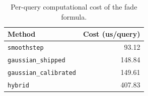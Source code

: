 \begin{table}[htb]
\centering
\caption{Per-query computational cost of the fade formula.}
\label{tab:fadecost}
\footnotesize
\setlength{\tabcolsep}{4pt}
\begin{tabular}{@{}lr@{}}
\toprule
Method & Cost (us/query) \\
\midrule
\texttt{smoothstep} & 93.12 \\
\texttt{gaussian\_shipped} & 148.84 \\
\texttt{gaussian\_calibrated} & 149.61 \\
\texttt{hybrid} & 407.83 \\
\bottomrule
\end{tabular}
\end{table}
